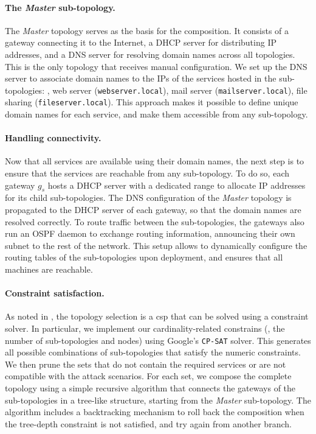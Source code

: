 \paragraph{The \emph{Master} sub-topology.}

The \emph{Master} topology serves as the basis for the composition.
It consists of a gateway connecting it to the Internet, a DHCP server for distributing IP addresses, and a DNS server for resolving domain names across all topologies.
This is the only topology that receives manual configuration.
We set up the DNS server to associate domain names to the IPs of the services hosted in the sub-topologies: \eg, web server (\texttt{webserver.local}), mail server (\texttt{mailserver.local}), file sharing (\texttt{fileserver.local}).
This approach makes it possible to define unique domain names for each service, and make them accessible from any sub-topology.


\paragraph{Handling connectivity.}

Now that all services are available using their domain names, the next step is to ensure that the services are reachable from any sub-topology.
To do so, each gateway $g_s$ hosts a DHCP server with a dedicated range to allocate IP addresses for its child sub-topologies.
The DNS configuration of the \emph{Master} topology is propagated to the DHCP server of each gateway, so that the domain names are resolved correctly.
To route traffic between the sub-topologies, the gateways also run an OSPF daemon to exchange routing information, announcing their own subnet to the rest of the network.
This setup allows to dynamically configure the routing tables of the sub-topologies upon deployment, and ensures that all machines are reachable.


\paragraph{Constraint satisfaction.}

As noted in , the topology selection is a \gls{csp} that can be solved using a constraint solver.
In particular, we implement our cardinality-related constrains (\ie, the number of sub-topologies and nodes) using Google's \texttt{CP-SAT} solver.
This generates all possible combinations of sub-topologies that satisfy the numeric constraints.
We then prune the sets that do not contain the required services or are not compatible with the attack scenarios.
For each set, we compose the complete topology using a simple recursive algorithm that connects the gateways of the sub-topologies in a tree-like structure, starting from the \emph{Master} sub-topology.
The algorithm includes a backtracking mechanism to roll back the composition when the tree-depth constraint is not satisfied, and try again from another branch.